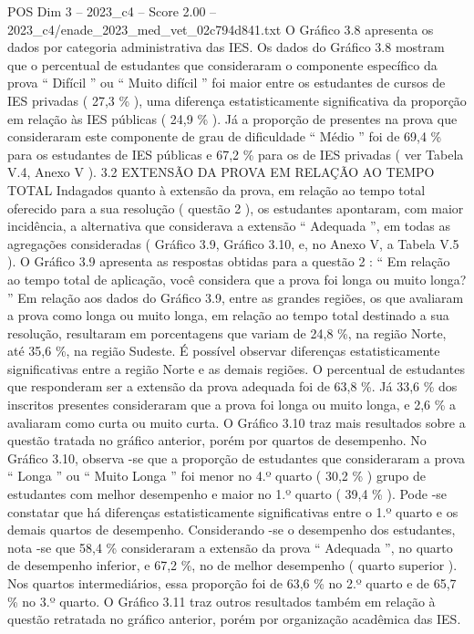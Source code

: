 \begin{textsample}{POS Dim 3 – 2023\_c4 – Score 2.00 – 2023\_c4/enade\_2023\_med\_vet\_02c794d841.txt}
O Gráfico 3.8 apresenta os dados por categoria administrativa das IES.
Os dados do Gráfico 3.8 mostram que o percentual de estudantes que consideraram o componente específico da prova “ Difícil ” ou “ Muito difícil ” foi maior entre os estudantes de cursos de IES privadas ( 27,3 \% ), uma diferença estatisticamente significativa da proporção em relação às IES públicas ( 24,9 \% ).
Já a proporção de presentes na prova que consideraram este componente de grau de dificuldade “ Médio ” foi de 69,4 \% para os estudantes de IES públicas e 67,2 \% para os de IES privadas ( ver Tabela V.4, Anexo V ). 3.2 EXTENSÃO DA PROVA EM RELAÇÃO AO TEMPO TOTAL Indagados quanto à extensão da prova, em relação ao tempo total oferecido para a sua resolução ( questão 2 ), os estudantes apontaram, com maior incidência, a alternativa que considerava a extensão “ Adequada ”, em todas as agregações consideradas ( Gráfico 3.9, Gráfico 3.10, e, no Anexo V, a Tabela V.5 ).
O Gráfico 3.9 apresenta as respostas obtidas para a questão 2 : “ Em relação ao tempo total de aplicação, você considera que a prova foi longa ou muito longa? ” Em relação aos dados do Gráfico 3.9, entre as grandes regiões, os que avaliaram a prova como longa ou muito longa, em relação ao tempo total destinado a sua resolução, resultaram em porcentagens que variam de 24,8 \%, na região Norte, até 35,6 \%, na região Sudeste.
É possível observar diferenças estatisticamente significativas entre a região Norte e as demais regiões.
O percentual de estudantes que responderam ser a extensão da prova adequada foi de 63,8 \%.
Já 33,6 \% dos inscritos presentes consideraram que a prova foi longa ou muito longa, e 2,6 \% a avaliaram como curta ou muito curta.
O Gráfico 3.10 traz mais resultados sobre a questão tratada no gráfico anterior, porém por quartos de desempenho.
No Gráfico 3.10, observa -se que a proporção de estudantes que consideraram a prova “ Longa ” ou “ Muito Longa ” foi menor no 4.º quarto ( 30,2 \% ) grupo de estudantes com melhor desempenho e maior no 1.º quarto ( 39,4 \% ).
Pode -se constatar que há diferenças estatisticamente significativas entre o 1.º quarto e os demais quartos de desempenho.
Considerando -se o desempenho dos estudantes, nota -se que 58,4 \% consideraram a extensão da prova “ Adequada ”, no quarto de desempenho inferior, e 67,2 \%, no de melhor desempenho ( quarto superior ).
Nos quartos intermediários, essa proporção foi de 63,6 \% no 2.º quarto e de 65,7 \% no 3.º quarto.
O Gráfico 3.11 traz outros resultados também em relação à questão retratada no gráfico anterior, porém por organização acadêmica das IES.

\end{textsample}
